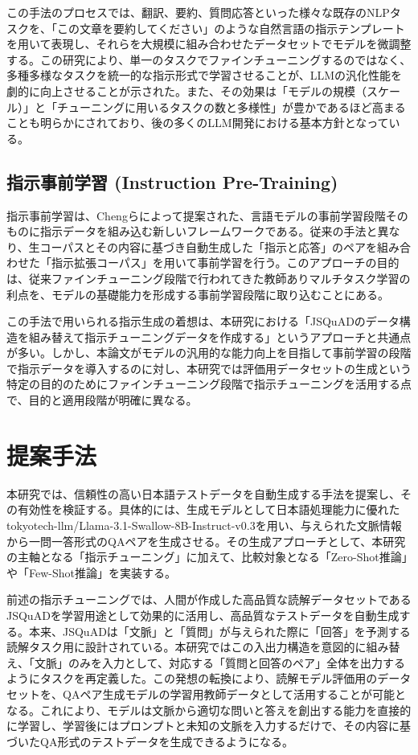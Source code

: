 \documentclass[twocolumn]{jsarticle}
\begin{document}
この手法のプロセスでは、翻訳、要約、質問応答といった様々な既存のNLPタスクを、「この文章を要約してください」のような自然言語の指示テンプレートを用いて表現し、それらを大規模に組み合わせたデータセットでモデルを微調整する。この研究により、単一のタスクでファインチューニングするのではなく、多種多様なタスクを統一的な指示形式で学習させることが、LLMの汎化性能を劇的に向上させることが示された。また、その効果は「モデルの規模（スケール）」と「チューニングに用いるタスクの数と多様性」が豊かであるほど高まることも明らかにされており、後の多くのLLM開発における基本方針となっている。

\subsection{指示事前学習 (Instruction Pre-Training)}
指示事前学習は、Chengらによって提案された\cite{Instruction Pre-Training}、言語モデルの事前学習段階そのものに指示データを組み込む新しいフレームワークである。従来の手法と異なり、生コーパスとその内容に基づき自動生成した「指示と応答」のペアを組み合わせた「指示拡張コーパス」を用いて事前学習を行う。このアプローチの目的は、従来ファインチューニング段階で行われてきた教師ありマルチタスク学習の利点を、モデルの基礎能力を形成する事前学習段階に取り込むことにある。

この手法で用いられる指示生成の着想は、本研究における「JSQuADのデータ構造を組み替えて指示チューニングデータを作成する」というアプローチと共通点が多い。しかし、本論文がモデルの汎用的な能力向上を目指して事前学習の段階で指示データを導入するのに対し、本研究では評価用データセットの生成という特定の目的のためにファインチューニング段階で指示チューニングを活用する点で、目的と適用段階が明確に異なる。



\section{提案手法}

本研究では、信頼性の高い日本語テストデータを自動生成する手法を提案し、その有効性を検証する。具体的には、生成モデルとして日本語処理能力に優れたtokyotech-llm/Llama-3.1-Swallow-8B-Instruct-v0.3\cite{Fujii:COLM2024}\cite{Okazaki:COLM2024}\cite{ma:arxiv2025}を用い、与えられた文脈情報から一問一答形式のQAペアを生成させる。その生成アプローチとして、本研究の主軸となる「指示チューニング」\cite{Instruction-Tuning}に加えて、比較対象となる「Zero-Shot推論」や「Few-Shot推論」を実装する。

前述の指示チューニングでは、人間が作成した高品質な読解データセットであるJSQuAD\cite{JSQuAD}を学習用途として効果的に活用し、高品質なテストデータを自動生成する。本来、JSQuADは「文脈」と「質問」が与えられた際に「回答」を予測する読解タスク用に設計されている。本研究ではこの入出力構造を意図的に組み替え、「文脈」のみを入力として、対応する「質問と回答のペア」全体を出力するようにタスクを再定義した。この発想の転換により、読解モデル評価用のデータセットを、QAペア生成モデルの学習用教師データとして活用することが可能となる。これにより、モデルは文脈から適切な問いと答えを創出する能力を直接的に学習し、学習後にはプロンプトと未知の文脈を入力するだけで、その内容に基づいたQA形式のテストデータを生成できるようになる。
\end{document}
